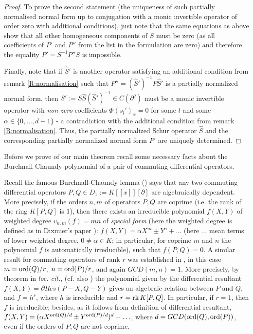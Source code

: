 \documentclass[11pt]{article}
\theoremstyle{definition}
\newcommand{\ord}{\mathop{\rm ord}\nolimits}
\newcommand{\rk}{\mathop {\rm rk}}
\theoremstyle{plain}
\numberwithin{equation}{section}
\begin{document}
\begin{proof}
To prove the second statement (the uniqueness of such partially normalised normal form up to conjugation with a monic invertible operator of order zero with additional conditions), just note that the same equations as above show that all other homogeneous components of $S$ must be zero (as all coefficients of  $P'$ and $P''$ from the list in the formulation are zero) and therefore the equality $P'=S^{-1}P''S$ is impossible. 

Finally, note that if $\hat{S}'$ is another operator satisfying an additional condition from remark \ref{R:normalisation} such that $P''=(\hat{S}')^{-1}P\hat{S}'$ is a partially normalized normal form, then
$S':=S\hat{S}(\hat{S}')^{-1}\in C(\partial^q)$ must be a monic invertible operator  with {\it non-zero} coefficients  $\Phi (s_{l}')_{\alpha}=0$ for some $l$ and some $\alpha \in \{0, \ldots , d-1\}$ - a contradiction with the additional condition from remark \ref{R:normalisation}. Thus, the partially normalized Schur operator $\hat{S}$ and the corresponding partially normalized normal form $P'$ are uniquely determined. 

\end{proof}





Before we prove of our main theorem recall some necessary facts about the Burchnall-Chaundy polynomial of a pair of commuting differential operators. 

Recall the famous Burchnall-Chaundy lemma (\cite{BC1}) says  that any two commuting differential operators $P,Q\in D_1:=K[[x]][\partial ]$ are algebraically dependent. More precisely, if the orders $n, m$ of operators $P,Q$ are coprime (i.e. the rank of the ring $K[P,Q]$ is 1), then there exists an irreducible polynomial $f(X,Y)$ of weighted degree $v_{n,m}(f)=mn$ of {\it special form} (here the weighted degree is defined as in Dixmier's paper \cite{Dixmier}): $f(X,Y) = \alpha X^m\pm Y^n+\ldots $ (here $\ldots$ mean terms of lower weighted degree, $0\neq\alpha\in K$; in particular, for coprime $m$ and $n$ the polynomial $f$ is automatically irreducible), such that $f(P,Q)=0$. A similar result for commuting operators of rank $r$ was established in \cite{Wilson}, in this case $m=\ord (Q)/r$, $n=\ord (P)/r$, and again $GCD(m,n)=1$. More precisely, by theorem in {\it loc. cit.}, (cf. also \cite{Previato2019}) the polynomial given by the differential resultant $f(X,Y)=\partial Res(P-X,Q-Y)$ gives an algebraic relation between $P$ and $Q$, and $f=h^r$, where $h$ is irreducible and $r=\rk K[P,Q]$. In particular, if $r=1$, then $f$ is irreducible; besides, as it follows from definition of differential resultant, $f(X,Y) = (\alpha X^{\ord (Q)/d}\pm Y^{\ord (P)/d})^d+\ldots $, where $d=GCD (\ord (Q), \ord (P))$, even if the orders of $P,Q$ are not coprime. 
\end{document}
